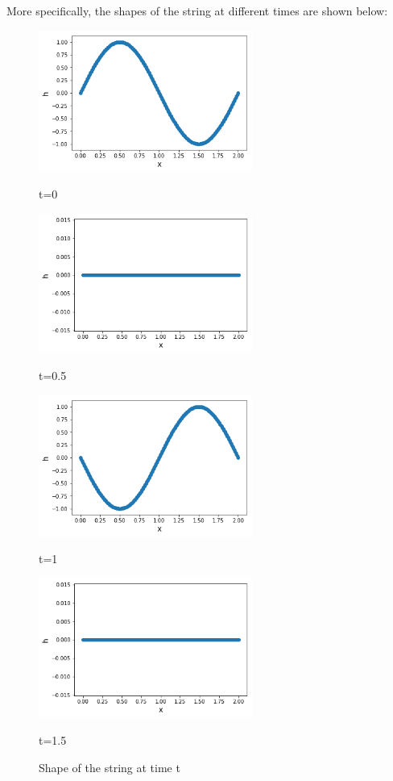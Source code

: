 \documentclass[11pt]{article}
\begin{document}
More specifically, the shapes of the string at different times are shown below:

\begin{figure}[H]
	\centering
	\begin{minipage}{8cm}
		\includegraphics[width=7cm]{0.png}   
		\caption*{t=0}
		\end{minipage}    
	\begin{minipage}{8cm}
		\includegraphics[width=7cm]{0_5.png}   
		\caption*{t=0.5}
	\end{minipage}  

    \begin{minipage}{8cm}
    	\includegraphics[width=7cm]{1.png}   
    	\caption*{t=1}
        \end{minipage}  
    \begin{minipage}{8cm}
    	\includegraphics[width=7cm]{1_5.png}  
    	\caption*{t=1.5} 
    \end{minipage}  
	\caption{Shape of the string at time t}
\end{figure}
\end{document}
